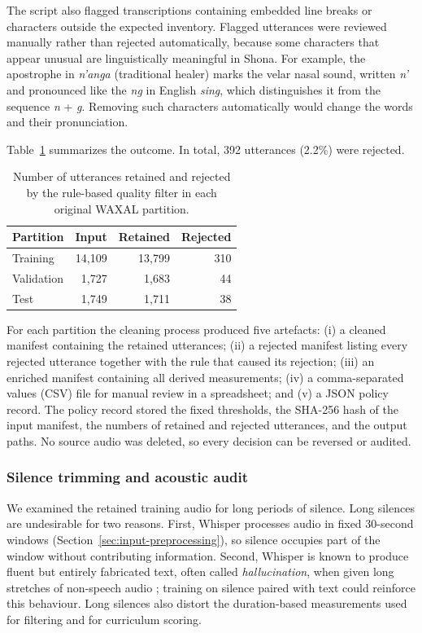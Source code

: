 The script also flagged transcriptions containing embedded line breaks or
characters outside the expected inventory. Flagged utterances were reviewed
manually rather than rejected automatically, because some characters that appear
unusual are linguistically meaningful in Shona. For example, the apostrophe in
\emph{n'anga} (traditional healer) marks the velar nasal sound, written
\emph{n'} and pronounced like the \emph{ng} in English \emph{sing}, which
distinguishes it from the sequence \emph{n} + \emph{g}. Removing such characters
automatically would change the words and their pronunciation.

Table~\ref{tab:filtering} summarizes the outcome. In total, 392 utterances
(2.2\%) were rejected.

\begin{table}[H]
    \centering
    \begin{tabular}{|l|r|r|r|}
        \hline
        Partition & Input & Retained & Rejected \\
        \hline
        Training & 14,109 & 13,799 & 310 \\
        \hline
        Validation & 1,727 & 1,683 & 44 \\
        \hline
        Test & 1,749 & 1,711 & 38 \\
        \hline
    \end{tabular}
    \caption{Number of utterances retained and rejected by the rule-based quality
    filter in each original WAXAL partition.}
    \label{tab:filtering}
\end{table}

For each partition the cleaning process produced five artefacts: (i) a cleaned
manifest containing the retained utterances; (ii) a rejected manifest listing
every rejected utterance together with the rule that caused its rejection; (iii)
an enriched manifest containing all derived measurements; (iv) a
comma-separated values (CSV) file for manual review in a spreadsheet; and (v) a
JSON policy record. The policy record stored the fixed thresholds, the SHA-256
hash of the input manifest, the numbers of retained and rejected utterances, and
the output paths. No source audio was deleted, so every decision can be reversed
or audited.

\subsubsection{Silence trimming and acoustic audit}
\label{sec:silence}

We examined the retained training audio for long periods of silence. Long
silences are undesirable for two reasons. First, Whisper processes audio in
fixed 30-second windows (Section~\ref{sec:input-preprocessing}), so silence
occupies part of the window without contributing information. Second, Whisper is
known to produce fluent but entirely fabricated text, often called
\emph{hallucination}, when given long stretches of non-speech audio
\citep{Koenecke2024}; training on silence paired with text could reinforce this
behaviour. Long silences also distort the duration-based measurements used for
filtering and for curriculum scoring.

